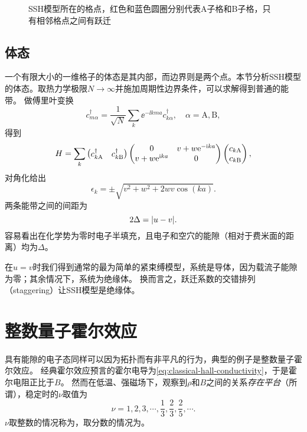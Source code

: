 \begin{figure}
    \centering
    
    \caption{SSH模型所在的格点，红色和蓝色圆圈分别代表A子格和B子格，只有相邻格点之间有跃迁}
\end{figure}

\subsection{体态}

一个有限大小的一维格子的体态是其内部，而边界则是两个点。本节分析SSH模型的体态。取热力学极限$N \to \infty$并施加周期性边界条件，可以求解得到普通的能带。
做傅里叶变换
\begin{equation}
    c_{m \alpha}^\dagger = \frac{1}{\sqrt{N}} \sum_k \ee^{- \ii k m a} c_{k \alpha}^\dagger, \quad \alpha = \text{A}, \text{B},
\end{equation}
得到
\begin{equation}
    H = \sum_k \pmqty{c^\dagger_{k \text{A}} & c^\dagger_{k \text{B}}} \pmqty{ 0 & v + w \ee^{- \ii k a} \\ v + w \ee^{\ii k a} & 0 } \pmqty{ c_{k \text{A}} \\ c_{k \text{B}} },
\end{equation}
对角化给出
\begin{equation}
    \epsilon_{k} = \pm \sqrt{ v^2 + w^2 + 2 wv \cos(ka) }.
\end{equation}
两条能带之间的间距为
\begin{equation}
    2 \Delta = \abs{u - v}.
\end{equation}
容易看出在化学势为零时电子半填充，且电子和空穴的能隙（相对于费米面的距离）均为$\Delta$。

在$u=v$时我们得到通常的最为简单的紧束缚模型，系统是导体，因为载流子能隙为零；其余情况下，系统为绝缘体。
换而言之，跃迁系数的交错排列（staggering）让SSH模型是绝缘体。

\section{整数量子霍尔效应}

具有能隙的电子态同样可以因为拓扑而有非平凡的行为，典型的例子是整数量子霍尔效应。
经典霍尔效应预言的霍尔电导为\eqref{eq:classical-hall-conductivity}，于是霍尔电阻正比于$B$。
然而在低温、强磁场下，观察到$\rho$和$B$之间的关系\emph{存在平台}（所谓），稳定时的$\nu$取值为
\[
    \nu = 1, 2, 3, \cdots, \frac{1}{3}, \frac{2}{3}, \frac{2}{5}, \cdots.
\]
$\nu$取整数的情况称为，取分数的情况为。

